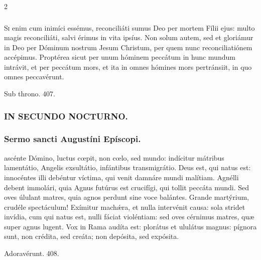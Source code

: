 \documentclass[9pt,twoside]{extarticle}
\begin{document}
\begin{multicols}{2}
\subsubsection*{\center {}}
\lettrine{S}i enim cum inimíci essémus, reconciliáti sumus Deo per mortem Fílii ejus: multo magis reconciliáti, salvi érimus in vita ipsíus.
Non solum autem, sed et gloriámur in Deo per Dóminum nostrum Jesum Christum, per quem nunc reconciliatiónem accépimus.
Proptérea sicut per unum hóminem peccátum in hunc mundum intrávit, et per peccátum mors, et ita in omnes hómines mors pertránsiit, in quo omnes peccavérunt.

\begin{tightlist}{}
\item {} Sub throno. 407.
\end{tightlist}

\subsubsection*{\center \textsc{IN SECUNDO NOCTURNO.}}
\subsubsection*{\center Sermo sancti Augustíni Epíscopi.}
\begin{center}\end{center}
ascénte Dómino, luctus cœpit, non cœlo, sed mundo: indícitur mátribus lamentátio, Angelis exsultátio, infántibus transmigrátio. Deus est, qui natus est: innocéntes illi debéntur víctima, qui venit damnáre mundi malítiam. Agnélli debent immolári, quia Agnus futúrus est crucifígi, qui tollit peccáta mundi. Sed oves úlulant matres, quia agnos perdunt sine voce balántes. Grande martýrium, crudéle spectáculum! Exímitur machǽra, et nulla intervénit causa: sola stridet invídia, cum qui natus est, nulli fáciat violéntiam: sed oves cérnimus matres, quæ super agnus lugent. Vox in Rama audíta est: plorátus et ululátus magnus: pígnora sunt, non crédita, sed creáta; non depósita, sed expósita.

\begin{tightlist}{}
\item {} Adoravérunt. 408.
\end{tightlist}


\end{multicols}
\end{document}
